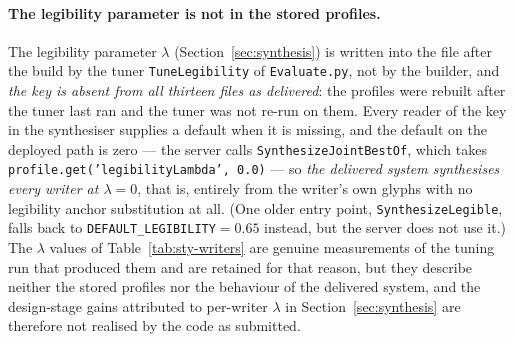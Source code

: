 \begin{table}[!htbp]
\caption{Scalar values of the thirteen stored style profiles, read directly from the files in \texttt{Software/CNN/NOGIT/StyleProfiles10}: kept lines, slant, pixel x-height, stroke width (x-heights), ascender $A$ and descender $D$ and word gap (x-heights), connectedness, legibility parameter $\lambda$, number of characters and number of variants. Writers 150 to 588 are database writers, the last five are the personal writers. $^\dagger$The $\lambda$ column is \emph{not} read from these files: the key \texttt{legibilityLambda} is absent from every one of them, and the values shown are the output of an earlier tuning run that predates the current profiles; abhinav, owen and thiya were added afterwards and were never tuned. An earlier version of this table listed ten writers and the scalar values of a superseded build.}
\label{tab:sty-writers}
\end{table}

\paragraph{The legibility parameter is not in the stored profiles.}
The legibility parameter $\lambda$ (Section~\ref{sec:synthesis}) is written into the file after the build by the tuner \texttt{TuneLegibility} of \texttt{Evaluate.py}, not by the builder, and \emph{the key is absent from all thirteen files as delivered}: the profiles were rebuilt after the tuner last ran and the tuner was not re-run on them.
Every reader of the key in the synthesiser supplies a default when it is missing, and the default on the deployed path is zero --- the server calls \texttt{SynthesizeJointBestOf}, which takes \texttt{profile.get('legibilityLambda',\,0.0)} --- so \emph{the delivered system synthesises every writer at $\lambda=0$}, that is, entirely from the writer's own glyphs with no legibility anchor substitution at all.
(One older entry point, \texttt{SynthesizeLegible}, falls back to \texttt{DEFAULT\_LEGIBILITY}${}=0.65$ instead, but the server does not use it.)
The $\lambda$ values of Table~\ref{tab:sty-writers} are genuine measurements of the tuning run that produced them and are retained for that reason, but they describe neither the stored profiles nor the behaviour of the delivered system, and the design-stage gains attributed to per-writer $\lambda$ in Section~\ref{sec:synthesis} are therefore not realised by the code as submitted.

